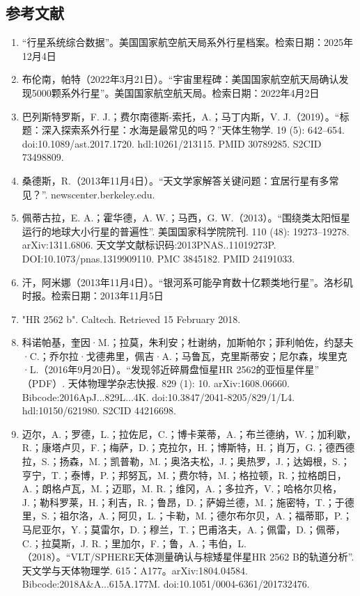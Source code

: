 \subsection{参考文献}
\begin{enumerate}
\item “行星系统综合数据”。美国国家航空航天局系外行星档案。检索日期：2025年12月4日
\item 布伦南，帕特（2022年3月21日）。“宇宙里程碑：美国国家航空航天局确认发现5000颗系外行星”。美国国家航空航天局。检索日期：2022年4月2日
\item 巴列斯特罗斯，F. J.；费尔南德斯-索托，A.；马丁内斯，V. J.（2019）。“标题：深入探索系外行星：水海是最常见的吗？”天体生物学. 19 (5): 642–654. doi:10.1089/ast.2017.1720. hdl:10261/213115. PMID 30789285. S2CID 73498809.
\item 桑德斯，R.（2013年11月4日）。“天文学家解答关键问题：宜居行星有多常见？”. newscenter.berkeley.edu.
\item 佩蒂古拉，E. A.；霍华德，A. W.；马西，G. W.（2013）。“围绕类太阳恒星运行的地球大小行星的普遍性”. 美国国家科学院院刊. 110 (48): 19273–19278. arXiv:1311.6806. 天文学文献标识码:2013PNAS..11019273P. DOI:10.1073/pnas.1319909110. PMC 3845182. PMID 24191033.
\item 汗，阿米娜（2013年11月4日）。“银河系可能孕育数十亿颗类地行星”。洛杉矶时报。检索日期：2013年11月5日
\item "HR 2562 b". Caltech. Retrieved 15 February 2018.
\item 科诺帕基，奎因·M.；拉莫，朱利安；杜谢纳，加斯帕尔；菲利帕佐，约瑟夫·C.；乔尔拉·戈德弗里，佩吉·A.；马鲁瓦，克里斯蒂安；尼尔森，埃里克·L.（2016年9月20日）。“发现邻近碎屑盘恒星HR 2562的亚恒星伴星” （PDF）. 天体物理学杂志快报. 829 (1): 10. arXiv:1608.06660. Bibcode:2016ApJ...829L...4K. doi:10.3847/2041-8205/829/1/L4. hdl:10150/621980. S2CID 44216698.
\item 迈尔，A.；罗德，L.；拉佐尼，C.；博卡莱蒂，A.；布兰德纳，W.；加利歇，R.；康塔卢贝，F.；梅萨，D.；克拉尔，H.；博斯特，H.；肖万，G.；德西德拉，S.；扬森，M.；凯普勒，M.；奥洛夫松，J.；奥热罗，J.；达姆根，S.；亨宁，T.；泰博，P.；邦努瓦，M.；费尔特，M.；格拉顿，R.；拉格朗日，A.；朗格卢瓦，M.；迈耶，M. R.；维冈，A.；多拉齐，V.；哈格尔贝格，J.；勒科罗莱，H.；利吉，R.；鲁昂，D.；萨姆兰德，M.；施密特，T.；于德里，S.；祖尔洛，A.；阿贝，L.；卡勒，M.；德尔布尔贝，A.；福蒂耶，P.；马尼亚尔，Y.；莫雷尔，D.；穆兰，T.；巴甫洛夫，A.；佩雷，D.；佩蒂，C.；拉莫斯，J. R.；里加尔，F.；鲁，A.；韦伯，L.（2018）。“VLT/SPHERE天体测量确认与棕矮星伴星HR 2562 B的轨道分析”. 天文学与天体物理学. 615：A177。arXiv:1804.04584. Bibcode:2018A&A...615A.177M. doi:10.1051/0004-6361/201732476.

\end{enumerate}
